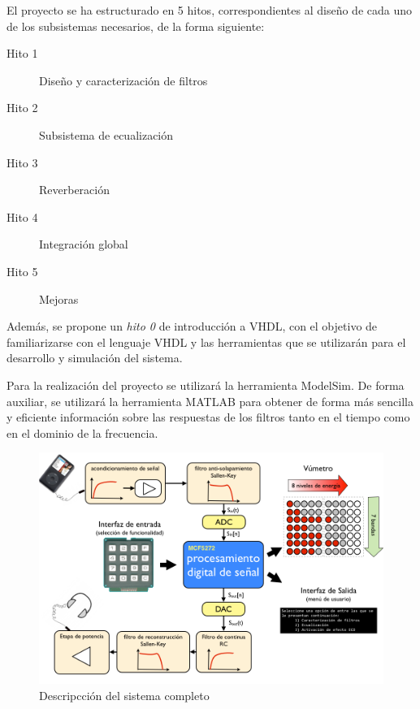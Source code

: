 \documentclass[a4paper,12pt]{article}
\begin{document}
El proyecto se ha estructurado en 5 hitos, correspondientes al diseño de cada uno de los subsistemas necesarios, de la forma siguiente:

\begin{description}
\item[Hito 1] Diseño y caracterización de filtros
\item[Hito 2] Subsistema de ecualización
\item[Hito 3] Reverberación
\item[Hito 4] Integración global
\item[Hito 5] Mejoras
\end{description}

Además, se propone un \emph{hito 0} de introducción a VHDL, con el objetivo de familiarizarse con el lenguaje VHDL y las herramientas que se utilizarán para el desarrollo y simulación del sistema.

Para la realización del proyecto se utilizará la herramienta ModelSim. De forma auxiliar, se utilizará la herramienta MATLAB para obtener de forma más sencilla y eficiente información sobre las respuestas de los filtros tanto en el tiempo como en el dominio de la frecuencia.

\begin{figure}[hbt]
\includegraphics[width=\textwidth]{img/system_description.png} 
\caption{Descripcción del sistema completo} \label{fig:sysdesc}
\end{figure}
\end{document}
